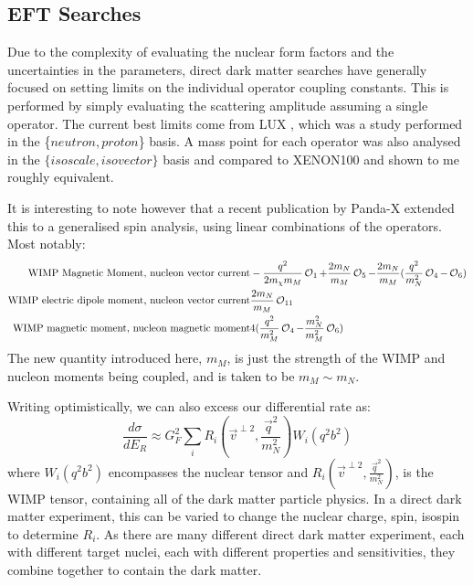 \subsection{EFT Searches}
\par
Due to the complexity of evaluating the nuclear form factors and the uncertainties in the parameters, direct dark matter searches have generally focused on setting limits on the individual operator coupling constants.
This is performed by simply evaluating the scattering amplitude assuming a single operator.
The current best limits come from LUX \cite{LUX_RUN4_EFT_2021}, which was a study performed in the \{$neutron,proton$\} basis.
A mass point for each operator was also analysed in the $\{isoscale, isovector\}$ basis and compared to XENON100 \cite{xenon100_eft_ref} and shown to me roughly equivalent.

\par
It is interesting to note however that a recent publication by Panda-X extended this to a generalised spin analysis, using linear combinations of the operators.
Most notably:
\begin{equation}
\begin{split}
    \text{WIMP Magnetic Moment, nucleon vector current} & -\frac{q^2}{2m_\chi m_M}\operatorname{\mathcal{O}}_1 + \frac{2m_N}{m_M}\operatorname{\mathcal{O}}_5 - \frac{2m_N}{m_M}(\frac{q^2}{m_N^2}\operatorname{\mathcal{O}}_4 - \operatorname{\mathcal{O}}_6) \\
    \text{WIMP electric dipole moment, nucleon vector current} & \frac{2m_N}{m_M}\operatorname{\mathcal{O}}_{11} \\
    \text{WIMP magnetic moment, nucleon magnetic moment} & 4(\frac{q^2}{m_M^2}\operatorname{\mathcal{O}}_4 - \frac{m_N^2}{m_M^2}\operatorname{\mathcal{O}}_6)
\end{split}
\end{equation}
The new quantity introduced here, $m_M$, is just the strength of the WIMP and nucleon moments being coupled, and is taken to be $m_M \sim m_N$.

\par
Writing optimistically, we can also excess our differential rate as:
\begin{equation}
    \frac{d\sigma}{dE_R} \approx G_F^2 \sum_{i} R_i (\vec{v}^{\perp 2}, \frac{\vec{q}^2}{m_N^2}) W_i(q^2b^2)
\end{equation}
where $W_i(q^2b^2)$ encompasses the nuclear tensor and $R_i (\vec{v}^{\perp 2}, \frac{\vec{q}^2}{m_N^2})$, is the WIMP tensor, containing all of the dark matter particle physics.
In a direct dark matter experiment, this can be varied to change the nuclear charge, spin, isospin to determine $R_i$.
As there are many different direct dark matter experiment, each with different target nuclei, each with different properties and sensitivities, they combine together to contain the dark matter.

\fi